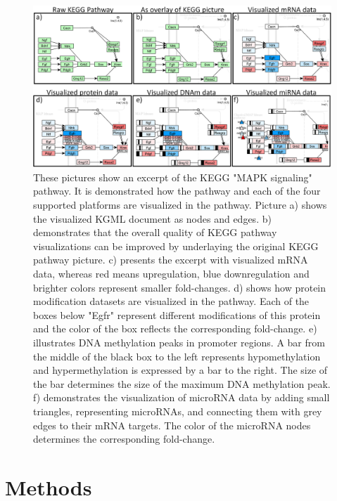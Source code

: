 \documentclass{bioinfo}
\begin{document}
\begin{figure}[t]
\centering
\includegraphics[width=1.0\textwidth]{figures/visualization-steps.png}
\caption{
These pictures show an excerpt of the KEGG "MAPK signaling" pathway. It is demonstrated how the
pathway and each of the four supported platforms are visualized in the pathway. Picture a) shows the
visualized KGML document as nodes and edges. b) demonstrates that the overall quality of KEGG
pathway visualizations can be improved by underlaying the original KEGG pathway picture. c) presents
the excerpt with visualized mRNA data, whereas red means upregulation, blue downregulation and
brighter colors represent smaller fold-changes. d) shows how protein modification datasets are
visualized in the pathway. Each of the boxes below "Egfr" represent different modifications of this
protein and the color of the box reflects the corresponding fold-change. e) illustrates DNA
methylation peaks in promoter regions. A bar from the middle of the black box to the left represents
hypomethylation and hypermethylation is expressed by a bar to the right. The size of the bar
determines the size of the maximum DNA methylation peak. f) demonstrates the visualization of
microRNA data by adding small triangles, representing microRNAs, and connecting them with grey edges
to their mRNA targets. The color of the microRNA nodes determines the corresponding fold-change.
}
\label{fig:visualization_steps}
\end{figure}


\section{Methods}
\end{document}
